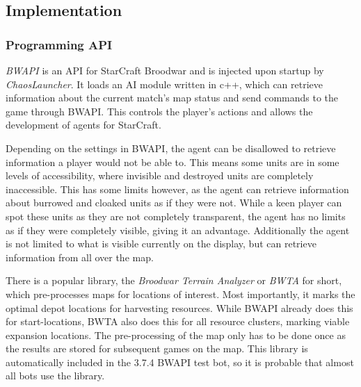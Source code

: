 	\subsection{Implementation}
		
	
		\subsubsection*{Programming API}
		\emph{BWAPI} is an API for StarCraft Broodwar and is injected upon startup by \emph{ChaosLauncher}. It loads an AI module written in c++, which can retrieve information about the current match's map status and send commands to the game through BWAPI. This controls the player's actions and allows the development of agents for StarCraft.
		
		Depending on the settings in BWAPI, the agent can be disallowed to retrieve information a player would not be able to. This means some units are in some levels of accessibility, where invisible and destroyed units are completely inaccessible. This has some limits however, as the agent can retrieve information about burrowed and cloaked units as if they were not. While a keen player can spot these units as they are not completely transparent, the agent has no limits as if they were completely visible, giving it an advantage. Additionally the agent is not limited to what is visible currently on the display, but can retrieve information from all over the map.
		
		There is a popular library, the \emph{Broodwar Terrain Analyzer} or \emph{BWTA} for short, which pre-processes maps for locations of interest. Most importantly, it marks the optimal depot locations for harvesting resources. While BWAPI already does this for start-locations, BWTA also does this for all resource clusters, marking viable expansion locations. The pre-processing of the map only has to be done once as the results are stored for subsequent games on the map. This library is automatically included in the 3.7.4 BWAPI test bot, so it is probable that almost all bots use the library.
		
